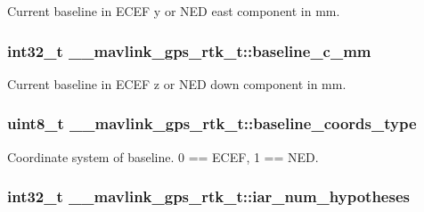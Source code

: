 Current baseline in E\+C\+E\+F y or N\+E\+D east component in mm. 

\hypertarget{struct____mavlink__gps__rtk__t_a394109be67f36b661b13c760228dfd86}{
\subsubsection[{baseline\+\_\+c\+\_\+mm}]{\setlength{\rightskip}{0pt plus 5cm}int32\+\_\+t \+\_\+\+\_\+mavlink\+\_\+gps\+\_\+rtk\+\_\+t\+::baseline\+\_\+c\+\_\+mm}}\label{struct____mavlink__gps__rtk__t_a394109be67f36b661b13c760228dfd86}


Current baseline in E\+C\+E\+F z or N\+E\+D down component in mm. 

\hypertarget{struct____mavlink__gps__rtk__t_ac2b2d6dd6676ce72dbf7b0b012c40978}{
\subsubsection[{baseline\+\_\+coords\+\_\+type}]{\setlength{\rightskip}{0pt plus 5cm}uint8\+\_\+t \+\_\+\+\_\+mavlink\+\_\+gps\+\_\+rtk\+\_\+t\+::baseline\+\_\+coords\+\_\+type}}\label{struct____mavlink__gps__rtk__t_ac2b2d6dd6676ce72dbf7b0b012c40978}


Coordinate system of baseline. 0 == E\+C\+E\+F, 1 == N\+E\+D. 

\hypertarget{struct____mavlink__gps__rtk__t_acab1b91b3c3532278f0d59182cd24e0a}{
\subsubsection[{iar\+\_\+num\+\_\+hypotheses}]{\setlength{\rightskip}{0pt plus 5cm}int32\+\_\+t \+\_\+\+\_\+mavlink\+\_\+gps\+\_\+rtk\+\_\+t\+::iar\+\_\+num\+\_\+hypotheses}}\label{struct____mavlink__gps__rtk__t_acab1b91b3c3532278f0d59182cd24e0a}



